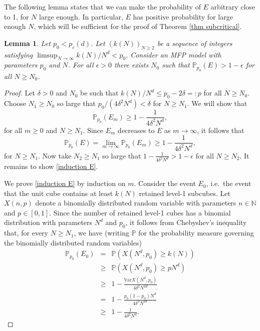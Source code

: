 \documentclass[11pt,a4paper]{article}
\newcommand{\IV}{\ensuremath{\mathbb{V}}}
\newcommand{\IN}{\ensuremath{\mathbb{N}}}
\newcommand{\pc}{\ensuremath{p_{c}(d)}}
\newcommand{\IP}{\ensuremath{\mathbb{P}}}
\newcommand{\Var}{\ensuremath{\IV\text{ar}}}
\newtheorem{lemma}[theorem]{Lemma}
\theoremstyle{remark}
\begin{document}
The following lemma states that we can make the probability of $E$ arbitrary close to 1, for $N$ large enough. In particular, $E$ has positive probability for large enough $N$, which will be sufficient for the proof of Theorem \ref{thm subcritical}.

\begin{lemma}\label{lem high prob}
 Let $p_0 < \pc$. Let $(k(N))_{N\geq 2}$ be a sequence of integers satisfying $\limsup_{N \to \infty} k(N)/N^d < p_0$. Consider an MFP model with parameters $p_0$ and $N$. For all $\epsilon>0$ there exists $N_0$ such that $\IP_{p_{0}}(E) > 1-\epsilon$ for all $N \geq N_0$.
\end{lemma}


\begin{proof} Let $\delta>0$ and $N_0$ be such that $k(N)/N^d \leq p_0-2\delta =:p$ for all $N \geq N_0$. Choose $N_1 \geq N_0$ so large that $p_0/(4\delta^2 N^d) < \delta $ for $N \geq N_1$. We will show that
\begin{equation}\label{induction E}
\IP_{p_{0}}(E_m) \geq 1-\frac{1}{4 \delta^2 N^{d}} ,
\end{equation}
for all $m\geq 0$ and $N\geq N_1$. Since $E_m$ decreases to $E$ as $m\to\infty$, it follows that 
\[
 \IP_{p_{0}}(E) = \lim_{m \to \infty} \IP_{p_{0}}(E_m) \geq 1-\frac{1}{4 \delta^2 N^{d}},
\]
for $N \geq N_1$. Now take $N_2\geq N_1$ so large that $1- \frac{1}{4 \delta^2 N^d} > 1- \epsilon$ for all $N \geq N_2$. It remains to show \eqref{induction E}.

We prove \eqref{induction E} by induction on $m$. Consider the event $E_0$, i.e.\ the event that the unit cube contains at least $k(N)$ retained level-1 subcubes. Let $X(n,p)$ denote a binomially distributed random variable with parameters $n\in \IN$ and $p\in [0,1]$. Since the number of retained level-1 cubes has a binomial distribution with parameters $N^{d}$ and $p_0$, it follows from Chebyshev's inequality that, for every $N \geq N_1$, we have (writing $\IP$ for the probability measure governing the binomially distributed random variables)
\begin{eqnarray*}
 \IP_{p_{0}}(E_0) &=& \IP(X(N^d,p_0) \geq k(N))  \\
 &\geq& \IP(X(N^d,p_0) \geq p N^d) \\
&\geq&  1- \frac{\Var X(N^d,p_0)}{4\delta^2 N^{2d}} \\
&=& 1 -\frac{p_0(1-p_0)N^d}{4 \delta^2 N^{2d}} \\
&\geq& 1- \frac{1}{4 \delta^2 N^{d}}.
\end{eqnarray*}


\end{proof}
\end{document}
